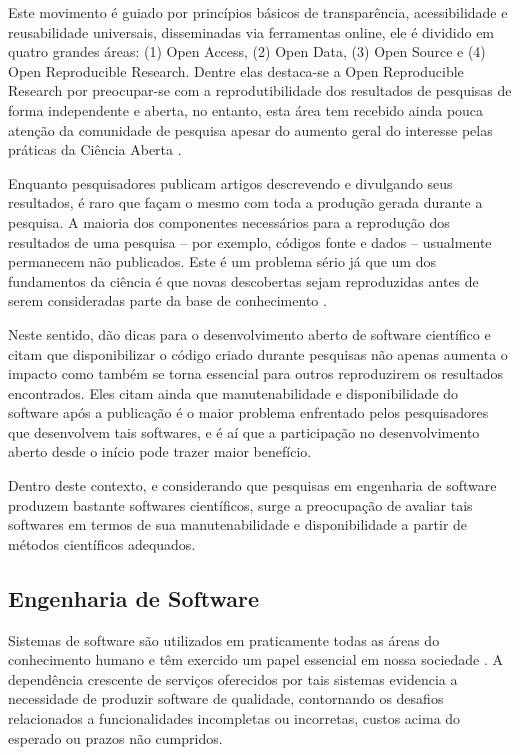 \documentclass[12pt]{article}
\begin{document}
Este movimento é guiado por princípios básicos de transparência,
acessibilidade e reusabilidade universais, disseminadas via ferramentas
online, ele é dividido em quatro grandes áreas: (1) Open Access, (2) Open
Data, (3) Open Source e (4) Open Reproducible Research. Dentre elas destaca-se
a Open Reproducible Research por preocupar-se com a reprodutibilidade dos
resultados de pesquisas de forma independente \cite{Stodden2009} e aberta, no
entanto, esta área tem recebido ainda pouca atenção da comunidade de pesquisa
\cite{Nancy2015} \cite{Grand2010Open} apesar do aumento geral do interesse
pelas práticas da Ciência Aberta \cite{Grand2010}.

Enquanto pesquisadores publicam artigos descrevendo e divulgando seus
resultados, é raro que façam o mesmo com toda a produção gerada durante a
pesquisa. A maioria dos componentes necessários para a reprodução dos
resultados de uma pesquisa -- por exemplo, códigos fonte e dados -- usualmente
permanecem não publicados. Este é um problema sério já que um dos fundamentos
da ciência é que novas descobertas sejam reproduzidas antes de serem
consideradas parte da base de conhecimento \cite{Stodden2009}.

Neste sentido,  dão dicas para o desenvolvimento aberto de software
científico e citam que disponibilizar o código criado durante pesquisas não
apenas aumenta o impacto como também se torna essencial para outros
reproduzirem os resultados encontrados. Eles citam ainda que manutenabilidade
e disponibilidade do software após a publicação é o maior problema enfrentado
pelos pesquisadores que desenvolvem tais softwares, e é aí que a
participação no desenvolvimento aberto desde o início pode trazer maior
benefício.

Dentro deste contexto, e considerando que pesquisas em engenharia de software
produzem bastante softwares científicos, surge a preocupação de avaliar tais
softwares em termos de sua manutenabilidade e disponibilidade a partir de
métodos científicos adequados.

\subsection{Engenharia de Software}

Sistemas de software são utilizados em praticamente todas as áreas do
conhecimento humano e têm exercido um papel essencial em nossa sociedade
\cite{Mafra2006}. A dependência crescente de serviços oferecidos por tais
sistemas evidencia a necessidade de produzir software de qualidade,
contornando os  desafios relacionados a funcionalidades incompletas ou
incorretas, custos acima do esperado ou prazos não cumpridos.
\end{document}

